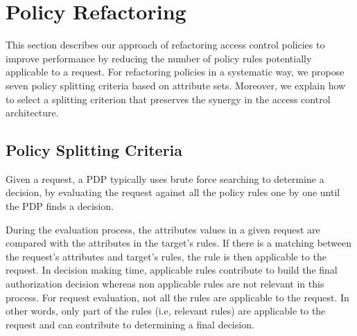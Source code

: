 \section{Policy Refactoring} \label{sec:approach}
This section describes our approach of refactoring access control policies to improve performance by reducing the number of policy 
rules potentially applicable to a request. For refactoring policies in a systematic way, we propose seven policy splitting 
criteria based on attribute sets. 
Moreover, we explain how to select a splitting criterion that preserves the synergy in the access control architecture.

\subsection{Policy Splitting Criteria} \label{subsec:SplittingCriteria}
Given a request, a PDP typically uses brute force searching to determine a decision, by evaluating the request against all the policy rules 
one by one until the PDP finds a decision.

During the evaluation process, the attributes values in a given request are compared with the attributes in the target's rules. 
If there is a matching between the request's attributes and target's rules, the rule is then applicable to the request.
In decision making time, applicable rules contribute
to build the final authorization decision whereas non applicable rules are not relevant in this process. 
For request evaluation, not all the rules are applicable to the request. In other words, only part of the rules (i.e, relevant rules) are
 applicable to the request and can contribute to determining a final decision.

